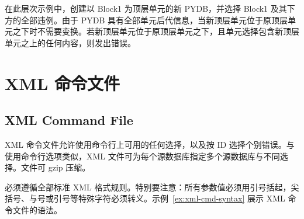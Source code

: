 在此层次示例中，创建以 Block1 为顶层单元的新 PYDB，并选择 Block1 及其下方的全部违例。由于 PYDB 具有全部单元后代信息，当新顶层单元位于原顶层单元之下时不需要变换。若新顶层单元位于原顶层单元之下，且单元选择包含新顶层单元之上的任何内容，则发出错误。

\section{XML 命令文件}
\subsection*{XML Command File}

XML 命令文件允许使用命令行上可用的任何选择，以及按 ID 选择个别错误。与使用命令行选项类似，XML 文件可为每个源数据库指定多个源数据库与不同选择。文件可 gzip 压缩。

必须遵循全部标准 XML 格式规则。特别要注意：所有参数值必须用引号括起，尖括号、与号或引号等特殊字符必须转义。示例~\ref{ex:xml-cmd-syntax} 展示 XML 命令文件的语法。

